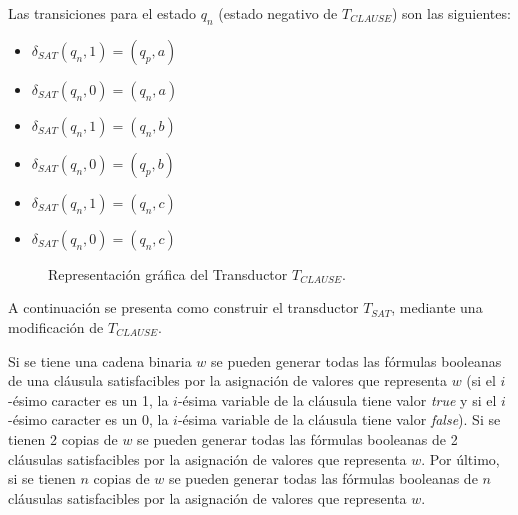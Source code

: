 \documentclass[12pt]{article}
\newcommand{\true}{\textit{true}}
\newcommand{\false}{\textit{false}}
\begin{document}
Las transiciones para el estado $q_n$ (estado negativo de $T_{CLAUSE}$) son las siguientes:
\begin{multicols}{2}
    \begin{itemize}
        \item $\delta_{SAT}(q_{n},1)=(q_{p},a)$
        \item $\delta_{SAT}(q_{n},0)=(q_{n},a)$
        \item $\delta_{SAT}(q_{n},1)=(q_{n},b)$
        \item $\delta_{SAT}(q_{n},0)=(q_{p},b)$
        \item $\delta_{SAT}(q_{n},1)=(q_{n},c)$
        \item $\delta_{SAT}(q_{n},0)=(q_{n},c)$
    \end{itemize}
\end{multicols}

\begin{figure}[h]
    \centering  \begin{otherlanguage}{english}
    \end{otherlanguage}
    \caption{Representación gráfica del Transductor $T_{CLAUSE}$.}
    \label{fig:transducer_clause} %
\end{figure}

A continuación se presenta como construir el transductor $T_{SAT}$, mediante una modificación de $T_{CLAUSE}$.

Si se tiene una cadena binaria $w$ se pueden generar todas las fórmulas booleanas de una cláusula 
satisfacibles por la asignación de valores que representa $w$ (si el $i$-ésimo caracter es un 1, la 
$i$-ésima variable de la cláusula tiene valor \true{} y si el $i$-ésimo caracter es un 0, la $i$-ésima 
variable de la cláusula tiene valor \false{}). Si se tienen 2 copias de $w$ se pueden generar todas las fórmulas 
booleanas de 2 cláusulas satisfacibles por la asignación de valores que representa $w$. 
Por último, si se tienen $n$ copias de $w$ se pueden generar todas las fórmulas booleanas de $n$ cláusulas satisfacibles por la asignación de valores que representa $w$.
\end{document}

